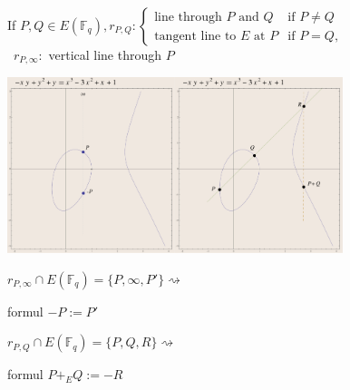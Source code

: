 \documentclass[10pt,handout]{beamer} %
\newcommand{\F}{\mathbb F}
\theoremstyle{definition}
\begin{document}
\begin{frame}

If $P,Q\in E(\F_q), r_{P,Q}:\begin{cases}
                     \text{line through $P$ and }Q &\text{if }P\neq Q\\
                     \text{tangent line to $E$ at }P &\text{if }P=Q,
                    \end{cases}$\\ \ \hfill $r_{P,\infty}:$ vertical line through $P$

\begin{center}
\includegraphics[width=4.9cm]{images/ad15.pdf}\includegraphics[width=4.9cm]{images/add7.pdf}\pause
\end{center}

{$r_{P,\infty}\cap E(\F_q)=\{P,\infty,P'\}$}\hfill$\rightsquigarrow$
{\begin{beamercolorbox}[shadow=true,center,rounded=true,wd=2cm]{formul}
             $-P:=P'$
            \end{beamercolorbox}}\medskip

{$r_{P,Q}\cap E(\F_q)=\{P,Q,R\}$}\hfill$\rightsquigarrow$
{\begin{beamercolorbox}[shadow=true,center,rounded=true,wd=2.9cm]{formul}
$P+_E Q:=-R$
            \end{beamercolorbox}}
\end{frame}
\end{document}
